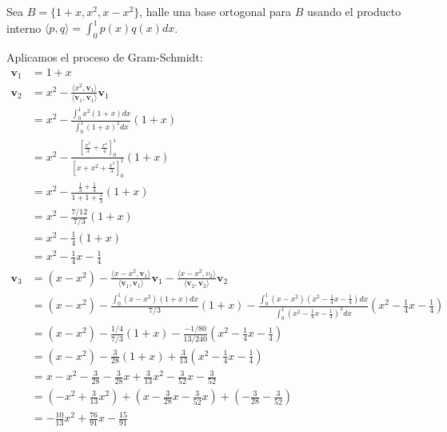 \begin{example}
Sea $B= \{1+x, x^2, x-x^2\}$, halle una base ortogonal para $B$ usando el producto interno $\langle p,q\rangle = \int_0^1 p(x)q(x)  dx$.
\begin{myproof}
Aplicamos el proceso de Gram-Schmidt:
\begin{align*}
\mathbf{v}_1 &= 1+x \\
\mathbf{v}_2 &= x^2 - \frac{\langle x^2, \mathbf{v}_1\rangle}{\langle \mathbf{v}_1, \mathbf{v}_1\rangle} \mathbf{v}_1 \\
    &= x^2 - \frac{\int_0^1 x^2(1+x)  dx}{\int_0^1 (1+x)^2  dx} (1+x) \\
    &= x^2 - \frac{\left[ \frac{x^3}{3} + \frac{x^4}{4} \right]_0^1}{\left[ x + x^2 + \frac{x^3}{3} \right]_0^1} (1+x) \\
    &= x^2 - \frac{\frac{1}{3} + \frac{1}{4}}{1 + 1 + \frac{1}{3}} (1+x) \\
    &= x^2 - \frac{7/12}{7/3} (1+x) \\
    &= x^2 - \frac{1}{4}(1+x) \\
    &= \boxed{x^2 - \frac{1}{4}x - \frac{1}{4}} \\
\mathbf{v}_3 &= (x - x^2) - \frac{\langle x - x^2, \mathbf{v}_1\rangle}{\langle \mathbf{v}_1, \mathbf{v}_1\rangle} \mathbf{v}_1 - \frac{\langle x - x^2, v_2\rangle}{\langle \mathbf{v}_2, \mathbf{v}_2\rangle} \mathbf{v}_2 \\
    &= (x - x^2) - \frac{\int_0^1 (x - x^2)(1+x)  dx}{7/3} (1+x) - \frac{\int_0^1 (x - x^2)(x^2 - \frac{1}{4}x - \frac{1}{4})  dx}{\int_0^1 (x^2 - \frac{1}{4}x - \frac{1}{4})^2  dx} \left(x^2 - \frac{1}{4}x - \frac{1}{4}\right) \\
    &= (x - x^2) - \frac{1/4}{7/3} (1+x) - \frac{-1/80}{13/240} \left(x^2 - \frac{1}{4}x - \frac{1}{4}\right) \\
    &= (x - x^2) - \frac{3}{28} (1+x) + \frac{3}{13} \left(x^2 - \frac{1}{4}x - \frac{1}{4}\right) \\
    &= x - x^2 - \frac{3}{28} - \frac{3}{28}x + \frac{3}{13}x^2 - \frac{3}{52}x - \frac{3}{52} \\
    &= \left(-x^2 + \frac{3}{13}x^2\right) + \left(x - \frac{3}{28}x - \frac{3}{52}x\right) + \left(-\frac{3}{28} - \frac{3}{52}\right) \\
    &= -\frac{10}{13}x^2 + \frac{76}{91}x - \frac{15}{91}
\end{align*}
\end{myproof}
\end{example}

